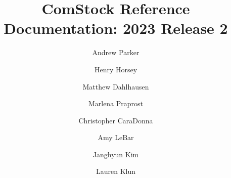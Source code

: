 \documentclass[]{nrel}
\title{ComStock Reference Documentation: 2023 Release 2}
\author{Andrew Parker}
\author{Henry Horsey}
\author{Matthew Dahlhausen}
\author{Marlena Praprost}
\author{Christopher CaraDonna}
\author{Amy LeBar}
\author{Janghyun Kim}
\author{Lauren Klun}
\affil{National Renewable Energy Laboratory}
\begin{document}
\frontmatter





\mainmatter
\tableofcontents

\listoffigures

\listoftables




\label{chap:3_sampling}












\cleardoublepage
\label{sec:Bib}
\printbibliography[title={\LARGE References}]
\begin{appendices} %




\end{appendices}
\end{document}
